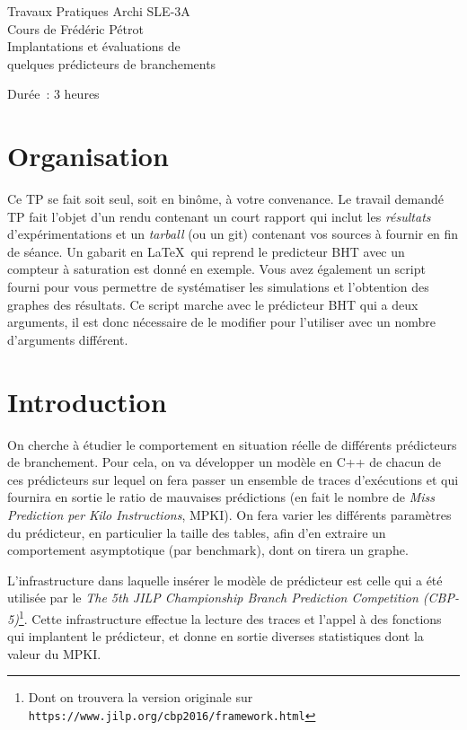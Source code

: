 \documentclass[a4paper]{article}
\begin{document}
\begin{center}
\large
Travaux Pratiques Archi SLE-3A\\
Cours de Frédéric Pétrot\\
\LARGE
Implantations et évaluations de\\
quelques prédicteurs de branchements\\
\large

Durée~: 3 heures
\end{center}
\section{Organisation}
Ce TP se fait soit seul, soit en binôme, à votre convenance.
Le travail demandé TP fait l'objet d'un rendu contenant un court rapport qui inclut les \emph{résultats} d'expérimentations et un \emph{tarball} (ou un git) contenant vos sources à fournir en fin de séance.
Un gabarit en \LaTeX\ qui reprend le predicteur BHT avec un compteur à saturation est donné en exemple.
Vous avez également un script fourni pour vous permettre de systématiser les simulations et l'obtention des graphes des résultats.
Ce script marche avec le prédicteur BHT qui a deux arguments, il est donc nécessaire de le modifier pour l'utiliser avec un nombre d'arguments différent.

\section{Introduction}
On cherche à étudier le comportement en situation réelle de différents prédicteurs de branchement.
Pour cela, on va développer un modèle en C++ de chacun de ces prédicteurs sur lequel on fera passer un ensemble de traces d'exécutions et qui fournira en sortie le ratio de mauvaises prédictions (en fait le nombre de \emph{Miss Prediction per Kilo Instructions}, MPKI).
On fera varier les différents paramètres du prédicteur, en particulier la taille des tables, afin d'en extraire un comportement asymptotique (par benchmark), dont on tirera un graphe.

L'infrastructure dans laquelle insérer le modèle de prédicteur est celle qui a été utilisée par le \emph{The 5th JILP Championship Branch Prediction Competition (CBP-5)}\footnote{Dont on trouvera la version originale sur \texttt{https://www.jilp.org/cbp2016/framework.html}}.
Cette infrastructure effectue la lecture des traces et l'appel à des fonctions qui implantent le prédicteur, et donne en sortie diverses statistiques dont la valeur du MPKI.
\end{document}
